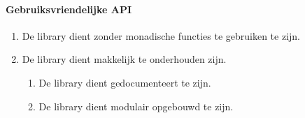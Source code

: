 
\paragraph{Gebruiksvriendelijke API}

\begin{enumerate}[label={R\arabic*}]
\setcounter{enumi}{\value{startvalue}}
		\item \label{req:mondadisch} De library dient zonder monadische functies te gebruiken te zijn.
		\item \label{req:maintenance} De library dient makkelijk te onderhouden zijn.
		\begin{enumerate}[label={R\arabic{enumi}.\arabic*}]
			\item De library dient gedocumenteert te zijn.
			\item De library dient modulair opgebouwd te zijn.
		\end{enumerate}
	\setcounter{startvalue}{\value{enumi}}
\end{enumerate}